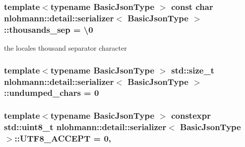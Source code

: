 \subsubsection[{\texorpdfstring{thousands\+\_\+sep}{thousands_sep}}]{\setlength{\rightskip}{0pt plus 5cm}template$<$typename Basic\+Json\+Type $>$ const char {\bf nlohmann\+::detail\+::serializer}$<$ Basic\+Json\+Type $>$\+::thousands\+\_\+sep = \textquotesingle{}\textbackslash{}0\textquotesingle{}}\hypertarget{classnlohmann_1_1detail_1_1serializer_a78a6ae833bb6cf7f00cb0d51db114b14}{}\label{classnlohmann_1_1detail_1_1serializer_a78a6ae833bb6cf7f00cb0d51db114b14}


the locale\textquotesingle{}s thousand separator character 

\subsubsection[{\texorpdfstring{undumped\+\_\+chars}{undumped_chars}}]{\setlength{\rightskip}{0pt plus 5cm}template$<$typename Basic\+Json\+Type $>$ std\+::size\+\_\+t {\bf nlohmann\+::detail\+::serializer}$<$ Basic\+Json\+Type $>$\+::undumped\+\_\+chars = 0}\hypertarget{classnlohmann_1_1detail_1_1serializer_a814f27bba20f0e109d0dbcaa4a399415}{}\label{classnlohmann_1_1detail_1_1serializer_a814f27bba20f0e109d0dbcaa4a399415}
\subsubsection[{\texorpdfstring{U\+T\+F8\+\_\+\+A\+C\+C\+E\+PT}{UTF8_ACCEPT}}]{\setlength{\rightskip}{0pt plus 5cm}template$<$typename Basic\+Json\+Type $>$ constexpr std\+::uint8\+\_\+t {\bf nlohmann\+::detail\+::serializer}$<$ Basic\+Json\+Type $>$\+::U\+T\+F8\+\_\+\+A\+C\+C\+E\+PT = 0\hspace{0.3cm}{\ttfamily [static]}, {\ttfamily [private]}}\hypertarget{classnlohmann_1_1detail_1_1serializer_a2311a8c756c4a119aa82cd55301d13bc}{}\label{classnlohmann_1_1detail_1_1serializer_a2311a8c756c4a119aa82cd55301d13bc}
